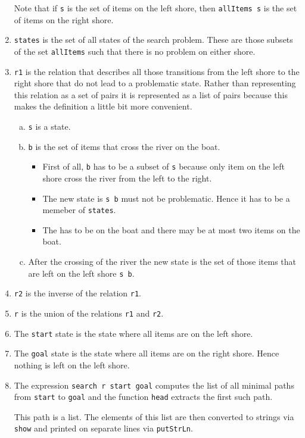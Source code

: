 \begin{enumerate}
            Note that if \texttt{s} is the set of items on the left shore, then
            \texttt{allItems  s} is the set of items on the right shore.
      \item \texttt{states} is the set of all states of the search problem.   These are those subsets of the
            set \texttt{allItems} such that there is no problem on either shore.
      \item \texttt{r1} is the relation that describes all those transitions from the left shore to the right
            shore that do not lead to a problematic state.  Rather than representing this relation as a set of
            pairs it is represented as a list of pairs because this makes the definition a little bit more convenient.
            \begin{enumerate}[(a)]
            \item \texttt{s} is a state.
            \item \texttt{b} is the set of items that cross the river on the boat.
                  \begin{itemize}
                  \item First of all, \texttt{b} has to be a subset of \texttt{s} because only item on the left
                        shore cross the river from the left to the right.
                  \item The new state is \texttt{s  b} must not be problematic.
                        Hence it has to be a memeber of \texttt{states}.
                  \item The  has to be on the boat and there may be at most two items on the boat.
                  \end{itemize}
            \item After the crossing of the river the new state is the set of those items that are left on the
                  left shore \texttt{s  b}.
            \end{enumerate}
      \item \texttt{r2} is the inverse of the relation \texttt{r1}.
      \item \texttt{r} is the union of the relations \texttt{r1} and \texttt{r2}.
      \item The \texttt{start} state is the state where all items are on the left shore.
      \item The \texttt{goal} state is the state where all items are on the right shore.  Hence nothing is left
            on the left shore.
      \item The expression \texttt{search r start goal} computes the list of all minimal paths from \texttt{start} to
            \texttt{goal} and the function \texttt{head} extracts the first such path.

            This path is a list. The elements of this list are then converted to strings via \texttt{show} and
            printed on separate lines via \texttt{putStrLn}.
 \end{enumerate}


